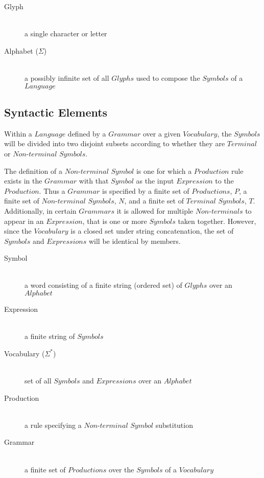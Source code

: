 \documentclass{article}
\begin{document}
    \begin{description}

    \item[Glyph] \hfill \\
    a single character or letter

    \item[Alphabet ($\Sigma$)] \hfill \\
    a possibly infinite set of all $Glyphs$ used to compose the
    $Symbols$ of a $Language$

    \end{description}

\subsection{Syntactic Elements}

Within a $Language$ defined by a $Grammar$ over a given $Vocabulary$,
the $Symbols$ will be divided into two disjoint subsets according to
whether they are $Terminal$ or $Non$-$terminal$ $Symbols$.

The definition of a $Non$-$terminal$ $Symbol$ is one for which a
$Production$ rule exists in the $Grammar$ with that $Symbol$ as the
input $Expression$ to the $Production$. Thus a $Grammar$ is specified
by a finite set of $Productions$, $P$, a finite set of
$Non$-$terminal$ $Symbols$, $N$, and a finite set of $Terminal$
$Symbols$, $T$. Additionally, in certain $Grammars$ it is allowed for
multiple $Non$-$terminals$ to appear in an $Expression$, that is one
or more $Symbols$ taken together. However, since the $Vocabulary$ is a
closed set under string concatenation, the set of $Symbols$ and
$Expressions$ will be identical by members.

    \begin{description}

    \item[Symbol] \hfill \\
    a word consisting of a finite string (ordered set) of $Glyphs$
    over an $Alphabet$

    \item[Expression] \hfill \\
    a finite string of $Symbols$

    \item[Vocabulary ($\Sigma^{*}$)] \hfill \\
    set of all $Symbols$ and $Expressions$ over an $Alphabet$

    \item[Production] \hfill \\
    a rule specifying a $Non$-$terminal$ $Symbol$ substitution

    \item[Grammar] \hfill \\
    a finite set of $Productions$ over the $Symbols$ of a $Vocabulary$

    \end{description}
\end{document}
